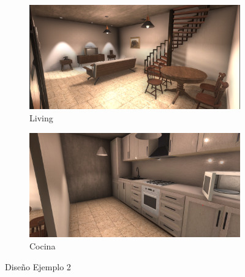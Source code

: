 \begin{figure}
     \centering
     \begin{subfigure}[b]{0.5\textwidth}
         \centering
         \includegraphics[width=\textwidth]{figs/2_1.png}
         \caption{Living}
         \label{1_1}
     \end{subfigure}
     \hfill
     \begin{subfigure}[b]{0.5\textwidth}
         \centering
         \includegraphics[width=\textwidth]{figs/2_2.png}
         \caption{Cocina}
         \label{1_2}
     \end{subfigure}
     \hfill
        \caption{Diseño Ejemplo 2}
        \label{diseno_2}
\end{figure}

